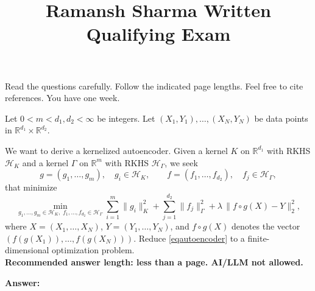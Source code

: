 \documentclass[12pt]{exam}
\def\R{\mathbb{R}}
\def\H{\mathcal{H}}
\begin{document}
\title{Ramansh Sharma Written Qualifying Exam}
\date{}
\maketitle


\noindent Read the questions carefully. Follow the indicated page lengths. Feel free to cite references. You have one week. 

\begin{questions}
\question Let $0<m<d_1,d_2<\infty$ be integers.  
Let $(X_1,Y_1),\dots,(X_N,Y_N)$ be data points in $\R^{d_1}\times\R^{d_2}$.  

We want to derive a kernelized autoencoder.  
Given a kernel $K$ on $\R^{d_1}$ with RKHS $\H_K$ and a kernel $\Gamma$ on $\R^m$ with RKHS $\H_\Gamma$, we seek 
\[
  g=(g_1,\dots,g_m),\quad g_i\in \H_K, 
  \qquad 
  f=(f_1,\dots,f_{d_2}),\quad f_j\in\H_\Gamma,
\]
that minimize
\begin{equation}\label{eqautoencoder}
\min_{g_1,\ldots,g_m \in \H_K,\; f_1,\ldots,f_{d_2} \in \H_\Gamma} 
\sum_{i=1}^m \|g_i\|_K^2
+ \sum_{j=1}^{d_2}\|f_j\|_\Gamma^2
+ \lambda \,\big\| f\circ g(X)-Y\big\|_2^2,
\end{equation}
where $X=(X_1,\ldots,X_N)$, $Y=(Y_1,\ldots,Y_N)$, and $f\circ g(X)$ denotes the vector $(f(g(X_1)),\dots,f(g(X_N)))$.  
Reduce \eqref{eqautoencoder} to a finite-dimensional optimization problem.\\
{\bf Recommended answer length: less than a page. AI/LLM not allowed.}

{\bf Answer:}


\end{questions}
\end{document}
